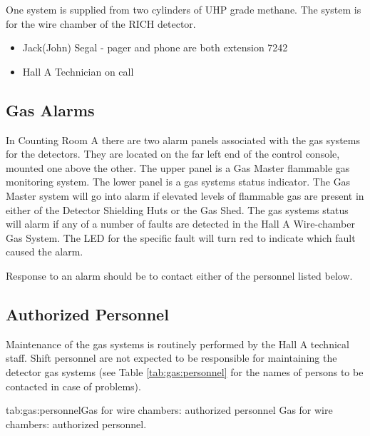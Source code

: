 One system is supplied from two cylinders of UHP grade methane.
The system is for the wire chamber of the RICH detector.


\begin{itemize} 
\item[~]Jack(John) Segal - pager and phone are both extension 7242
\item[~]Hall A Technician on call
\end{itemize} 

\begin{safetyen}{10}{15}
\section{Gas Alarms}
\label{sec:hrs-det-gasalarms}
\end{safetyen}

In Counting Room A there are two alarm panels associated with the gas
systems for the detectors.  They are located on the far left end of the
control console, mounted one above the other.  The upper panel is a
Gas Master flammable gas monitoring system.  The lower panel is a gas
systems status indicator.  The Gas Master system will go into alarm if
elevated levels of flammable gas are present in either of the Detector
Shielding Huts or the Gas Shed.
The gas systems status will
alarm if any of a number of faults are detected in the Hall A Wire-chamber
Gas System.  The LED for the specific fault will turn red to indicate which
fault caused the alarm.

Response to an alarm should be to contact either of the personnel listed below.

\begin{safetyen}{10}{15}
\section{Authorized Personnel}
\end{safetyen}

Maintenance of the gas systems is routinely performed by the Hall A
technical staff.  Shift personnel are not expected to be responsible
for maintaining the detector gas systems (see Table \ref{tab:gas:personnel}  
for the names of persons to be contacted in case of problems). 

\begin{namestab}{tab:gas:personnel}{Gas for wire chambers: authorized personnel}{%
      Gas for wire chambers: authorized personnel.}
  \JackSegal{}
\end{namestab}

